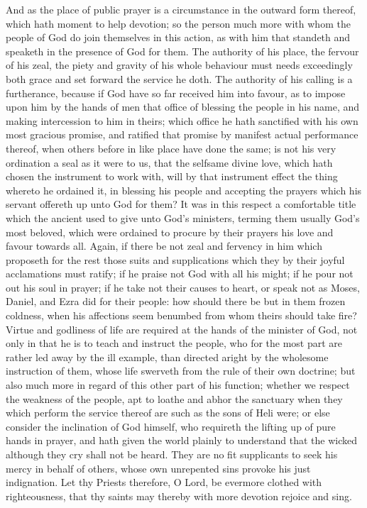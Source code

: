 And as the place of public prayer is a circumstance in the outward form thereof, which hath moment to help devotion; so the person much more with whom the people of God do join themselves in this action, as with him that standeth and speaketh in the presence of God for them. The authority of his place, the fervour of his zeal, the piety and gravity of his whole behaviour must needs exceedingly both grace and set forward the service he doth.
The authority of his calling is a furtherance, because if God have so far received him into favour, as to impose upon  him by the hands of men that office of blessing the people in his name, and making intercession to him in theirs; which office he hath sanctified with his own most gracious promise, and ratified that promise by manifest actual performance thereof, when others before in like place have done the same; is not his very ordination a seal as it were to us, that the selfsame divine love, which hath chosen the instrument to work with, will by that instrument effect the thing whereto he ordained it, in blessing his people and accepting the prayers which his servant offereth up unto God for them? It was in this respect a comfortable title which the ancient used to give unto God’s ministers, terming them usually God’s most beloved, which were ordained to procure by their prayers his love and favour towards all.
Again, if there be not zeal and fervency in him which proposeth for the rest those suits and supplications which they by their joyful acclamations must ratify; if he praise not God with all his might; if he pour not out his soul in prayer; if he take not their causes to heart, or speak not as Moses, Daniel, and Ezra did for their people: how should there be but in them frozen coldness, when his affections seem benumbed from whom theirs should take fire?
Virtue and godliness of life are required at the hands of the minister of God, not only in that he is to teach and instruct the people, who for the most part are rather led away by the ill example, than directed aright by the wholesome instruction of them, whose life swerveth from the rule of their own doctrine; but also much more in regard of this other part of his function; whether we respect the weakness of the people, apt to loathe and abhor the sanctuary when they which perform the service thereof are such as the sons of Heli were; or else consider the inclination of God himself, who requireth the lifting up of pure hands in prayer, and hath given the world plainly to understand that the wicked although they cry shall not be heard. They are no fit supplicants to seek his mercy in behalf of others, whose own unrepented sins provoke his just indignation. Let thy Priests therefore, O  Lord, be evermore clothed with righteousness, that thy saints may thereby with more devotion rejoice and sing.
